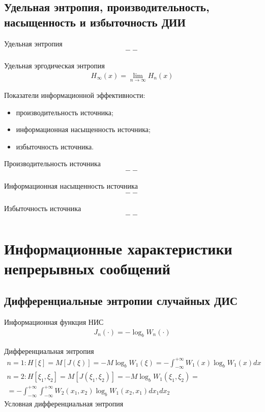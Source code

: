 \section{Удельная энтропия, производительность, насыщенность и избыточность ДИИ}

Удельная энтропия
\begin{align}
	--
\end{align}

Удельная эргодическая энтропия
\begin{align}
	H_{\infty}(x) = \lim_{n \rightarrow \infty}{H_n(x)}
\end{align}

Показатели информационной эффективности:
\begin{itemize}
	\item производительность источника;
	\item информационная насыщенность источника;
	\item избыточность источника.
\end{itemize}

Производительность источника
\begin{align}
	--
\end{align}

Информационная насыщенность источника
\begin{align}
	--
\end{align}

Избыточность источника
\begin{align}
	--
\end{align}

\chapter{Информационные характеристики непрерывных сообщений}

\section{Дифференциальные энтропии случайных ДИС}

Информационная функция НИС
\begin{align}
	J_n(\cdot) = -\log_b{W_n(\cdot)} 
\end{align}

Дифференциальная энтропия
\begin{gather}
	n=1: H[\xi] = M[J(\xi)] = -M\log_b{W_1(\xi)} = -\int_{-\infty}^{+\infty} W_1(x)\log_b{W_1(x)}dx \\
	n=2: H[\xi_1, \xi_2] =  M[J(\xi_1, \xi_2)] = -M\log_b{W_1(\xi_1, \xi_2)} =\nonumber\\= -\int_{-\infty}^{+\infty}\int_{-\infty}^{+\infty} W_2(x_1, x_2)\log_b{W_1(x_2, x_1)}dx_1dx_2\nonumber
\end{gather}
Условная дифференциальная энтропия

